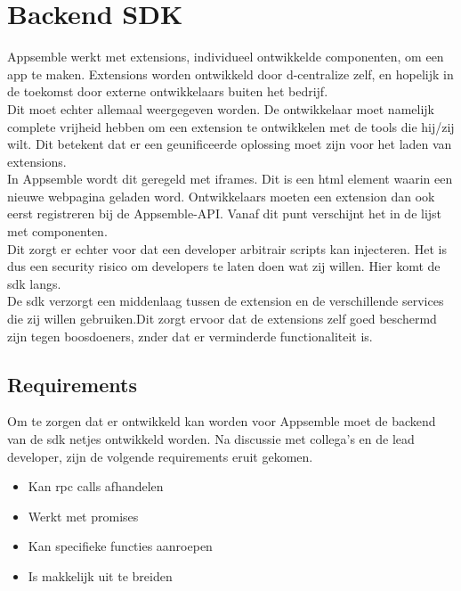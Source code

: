 \chapter{Backend SDK}

Appsemble werkt met extensions, individueel ontwikkelde componenten, om een app te maken. Extensions worden ontwikkeld door d-centralize zelf, en hopelijk in de toekomst door externe ontwikkelaars buiten het bedrijf. \\

Dit moet echter allemaal weergegeven worden. De ontwikkelaar moet namelijk complete vrijheid hebben om een extension te ontwikkelen met de tools die hij/zij wilt. Dit betekent dat er een geunificeerde oplossing moet zijn voor het laden van extensions. \\ 

In Appsemble wordt dit geregeld met iframes. Dit is een html element waarin een nieuwe webpagina geladen word. Ontwikkelaars moeten een extension dan ook eerst registreren bij de Appsemble-API. Vanaf dit punt verschijnt het in de lijst met componenten. \\

Dit zorgt er echter voor dat een developer arbitrair scripts kan injecteren. Het is dus een security risico om developers te laten doen wat zij willen. Hier komt de sdk langs. \\

De sdk verzorgt een middenlaag tussen de extension en de verschillende services die zij willen gebruiken.Dit zorgt ervoor dat de extensions zelf goed beschermd zijn tegen boosdoeners, znder dat er verminderde functionaliteit is.

\section{Requirements}

Om te zorgen dat er ontwikkeld kan worden voor Appsemble moet de backend van de sdk netjes ontwikkeld worden. Na discussie met collega's en de lead developer, zijn de volgende requirements eruit gekomen.

\begin{itemize}
	\item Kan rpc calls afhandelen
	\item Werkt met promises
	\item Kan specifieke functies aanroepen
	\item Is makkelijk uit te breiden
\end{itemize}

